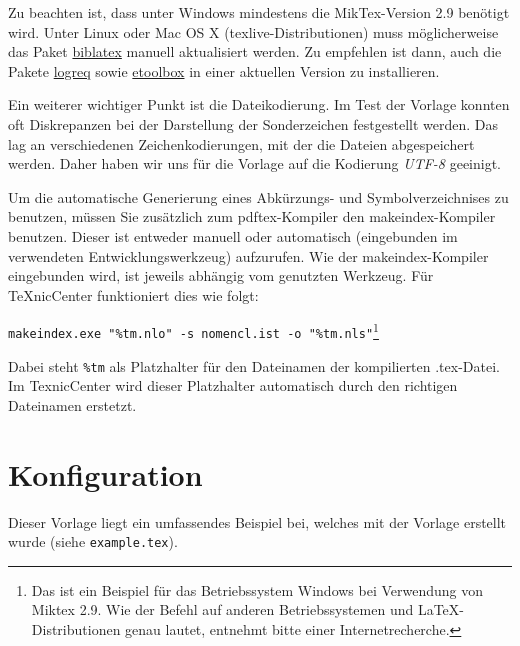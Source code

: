 Zu beachten ist, dass unter Windows mindestens die MikTex-Version 2.9 benötigt wird. Unter Linux oder Mac OS X (texlive-Distributionen) muss möglicherweise das Paket \href{http://ctan.org/tex-archive/macros/latex/contrib/biblatex}{biblatex} manuell aktualisiert werden. Zu empfehlen ist dann, auch die Pakete \href{http://ctan.org/tex-archive/macros/latex/contrib/logreq}{logreq} sowie \href{http://ctan.org/tex-archive/macros/latex/contrib/etoolbox}{etoolbox} in einer aktuellen Version zu installieren.

Ein weiterer wichtiger Punkt ist die Dateikodierung. Im Test der Vorlage konnten oft Diskrepanzen bei der Darstellung der Sonderzeichen festgestellt werden. Das lag an verschiedenen Zeichenkodierungen, mit der die Dateien abgespeichert werden. Daher haben wir uns für die Vorlage auf die Kodierung \emph{UTF-8} geeinigt.

Um die automatische Generierung eines Abkürzungs- und Symbolverzeichnises zu benutzen, müssen Sie zusätzlich zum pdftex-Kompiler den makeindex-Kompiler benutzen. Dieser ist entweder manuell oder automatisch (eingebunden im verwendeten Entwicklungswerkzeug) aufzurufen. Wie der makeindex-Kompiler eingebunden wird, ist jeweils abhängig vom genutzten Werkzeug. Für TeXnicCenter funktioniert dies wie folgt:

\noindent \begin{center} \verb|makeindex.exe "%tm.nlo" -s nomencl.ist -o "%tm.nls"|\footnote{Das ist ein Beispiel für das Betriebssystem Windows bei Verwendung von Miktex 2.9. Wie der Befehl auf anderen Betriebssystemen und \LaTeX-Distributionen genau lautet, entnehmt bitte einer Internetrecherche.}\end{center}

\noindent Dabei steht \verb|%tm| als Platzhalter für den Dateinamen der kompilierten .tex-Datei. Im TexnicCenter wird dieser Platzhalter automatisch durch den richtigen Dateinamen erstetzt.


\section{Konfiguration}

Dieser Vorlage liegt ein umfassendes Beispiel bei, welches mit der Vorlage erstellt wurde (siehe \verb-example.tex-).


